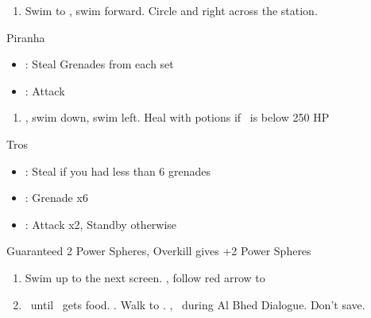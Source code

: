 \begin{enumerate}[resume]
	\item Swim to \save, swim forward. Circle and right across the station.
\end{enumerate}
\begin{battle}{Piranha}
	\begin{itemize}
		\item \rikku: Steal Grenades from each set
		\item \tidus: Attack
	\end{itemize}
\end{battle}
\begin{enumerate}[resume]
	\item \cs, swim down, swim left. Heal with potions if \rikku\ is  below 250 HP
\end{enumerate}
\begin{battle}[2200]{Tros}
	\begin{itemize}
		\item \rikku: Steal if you had less than 6 grenades
		\item \rikku: Grenade x6
		\item \tidus: Attack x2, Standby otherwise
	\end{itemize}
	Guaranteed 2 Power Spheres, Overkill gives +2 Power Spheres
\end{battle}
\begin{enumerate}[resume]
	\item Swim up to the next screen. \cs, follow red arrow to \cs[0:50]
	\item \sd\ until \tidus \ gets food. \cs[3:00]. Walk to \rikku. \cs[2:30], \sd\ during Al Bhed Dialogue. Don't save.
\end{enumerate}
